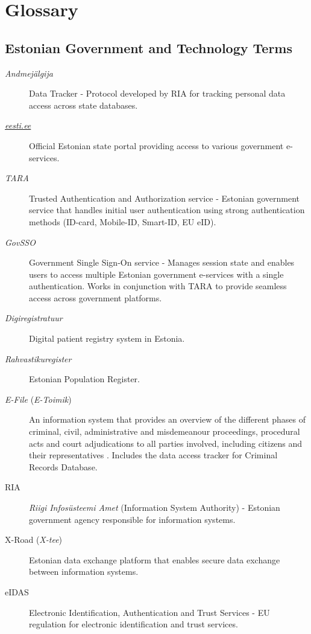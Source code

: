 \section{Glossary}

\subsection{Estonian Government and Technology Terms}

\begin{description}
    \item[\textit{Andmejälgija}] Data Tracker - Protocol developed by RIA for tracking personal data access across state databases.
    
    \item[\textit{\href{https://www.eesti.ee}{eesti.ee}}] Official Estonian state portal providing access to various government e-services.
    
    \item[\textit{TARA}] Trusted Authentication and Authorization service - Estonian government service that handles initial user authentication using strong authentication methods (ID-card, Mobile-ID, Smart-ID, EU eID).
    
    \item[\textit{GovSSO}] Government Single Sign-On service - Manages session state and enables users to access multiple Estonian government e-services with a single authentication. Works in conjunction with TARA to provide seamless access across government platforms.
    
    \item[\textit{Digiregistratuur}] Digital patient registry system in Estonia.
    
    \item[\textit{Rahvastikuregister}] Estonian Population Register.
    
    \item[\textit{E-File} (\textit{E-Toimik})] An information system that provides an overview of the different phases of criminal, civil, administrative and misdemeanour proceedings, procedural acts and court adjudications to all parties involved, including citizens and their representatives \cite{e-file-rik}. Includes the data access tracker for Criminal Records Database.
    
    \item[RIA] \textit{Riigi Infosüsteemi Amet} (Information System Authority) - Estonian government agency responsible for information systems.
    
    \item[X-Road (\textit{X-tee})] Estonian data exchange platform that enables secure data exchange between information systems.
    
    \item[eIDAS] Electronic Identification, Authentication and Trust Services - EU regulation for electronic identification and trust services.
\end{description}

